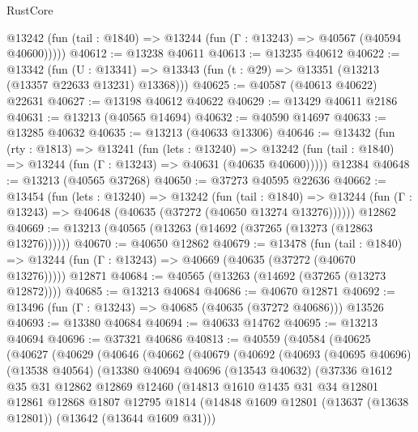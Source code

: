 \begin{lexlean}{RustCore}
\begin{coremodule}
      @13242 (fun (tail : @1840) => @13244 (fun (Γ : @13243) => @40567 (@40594 @40600)))))
@40612 := @13238 @40611
@40613 := @13235 @40612
@40622 := @13342
    (fun (U : @13341) => @13343 (fun (t : @29) => @13351 (@13213 (@13357 @22633 @13231) @13368)))
@40625 := @40587 (@40613 @40622) @22631
@40627 := @13198 @40612 @40622
@40629 := @13429 @40611 @2186
@40631 := @13213 (@40565 @14694)
@40632 := @40590 @14697
@40633 := @13285 @40632
@40635 := @13213 (@40633 @13306)
@40646 := @13432
    (fun (rty : @1813) =>
    @13241
      (fun (lets : @13240) =>
      @13242 (fun (tail : @1840) => @13244 (fun (Γ : @13243) => @40631 (@40635 @40600)))))
    @12384
@40648 := @13213 (@40565 @37268)
@40650 := @37273 @40595 @22636
@40662 := @13454
    (fun (lets : @13240) =>
    @13242
      (fun (tail : @1840) =>
      @13244 (fun (Γ : @13243) => @40648 (@40635 (@37272 (@40650 @13274 @13276))))))
    @12862
@40669 := @13213 (@40565 (@13263 (@14692 (@37265 (@13273 (@12863 @13276))))))
@40670 := @40650 @12862
@40679 := @13478
    (fun (tail : @1840) => @13244 (fun (Γ : @13243) => @40669 (@40635 (@37272 (@40670 @13276)))))
    @12871
@40684 := @40565 (@13263 (@14692 (@37265 (@13273 @12872))))
@40685 := @13213 @40684
@40686 := @40670 @12871
@40692 := @13496 (fun (Γ : @13243) => @40685 (@40635 (@37272 @40686))) @13526
@40693 := @13380 @40684
@40694 := @40633 @14762
@40695 := @13213 @40694
@40696 := @37321 @40686
@40813 := @40559
    (@40584
      (@40625
        (@40627
          (@40629
            (@40646
              (@40662
                (@40679
                  (@40692
                    (@40693
                      (@40695 @40696)
                      (@13538 @40564)
                      (@13380
                        @40694
                        @40696
                        (@13543 @40632)
                        (@37336
                          @1612
                          @35
                          @31
                          @12862
                          @12869
                          @12460
                          (@14813
                            @1610
                            @1435
                            @31
                            @34
                            @12801
                            @12861
                            @12868
                            @1807
                            @12795
                            @1814
                            (@14848
                              @1609
                              @12801
                              (@13637 (@13638 @12801))
                              (@13642 (@13644 @1609 @31)))

\end{coremodule}
\end{lexlean}

